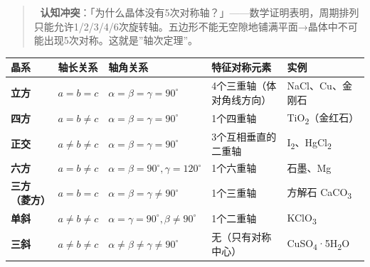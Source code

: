 \begin{quote}
🧠 \textbf{认知冲突}：「为什么晶体没有5次对称轴？」------数学证明表明，周期排列只能允许1/2/3/4/6次旋转轴。五边形不能无空隙地铺满平面→晶体中不可能出现5次对称。这就是''轴次定理''。
\end{quote}

{\def\LTcaptype{none} %
\begin{longtable}[]{@{}
  >{\raggedright\arraybackslash}p{}
  >{\raggedright\arraybackslash}p{}
  >{\raggedright\arraybackslash}p{}
  >{\raggedright\arraybackslash}p{}
  >{\raggedright\arraybackslash}p{}@{}}
\toprule\noalign{}
\begin{minipage}[b]{\linewidth}\raggedright
晶系
\end{minipage} & \begin{minipage}[b]{\linewidth}\raggedright
轴长关系
\end{minipage} & \begin{minipage}[b]{\linewidth}\raggedright
轴角关系
\end{minipage} & \begin{minipage}[b]{\linewidth}\raggedright
特征对称元素
\end{minipage} & \begin{minipage}[b]{\linewidth}\raggedright
实例
\end{minipage} \\
\midrule\noalign{}
\endhead
\bottomrule\noalign{}
\endlastfoot
\textbf{立方} & \(a = b = c\) & \(\alpha = \beta = \gamma = 90^\circ\) & 4个三重轴（体对角线方向） & NaCl、Cu、金刚石 \\
\textbf{四方} & \(a = b \neq c\) & \(\alpha = \beta = \gamma = 90^\circ\) & 1个四重轴 & TiO\textsubscript{2}（金红石） \\
\textbf{正交} & \(a \neq b \neq c\) & \(\alpha = \beta = \gamma = 90^\circ\) & 3个互相垂直的二重轴 & I\textsubscript{2}、HgCl\textsubscript{2} \\
\textbf{六方} & \(a = b \neq c\) & \(\alpha = \beta = 90^\circ, \gamma = 120^\circ\) & 1个六重轴 & 石墨、Mg \\
\textbf{三方（菱方）} & \(a = b = c\) & \(\alpha = \beta = \gamma \neq 90^\circ\) & 1个三重轴 & 方解石 CaCO\textsubscript{3} \\
\textbf{单斜} & \(a \neq b \neq c\) & \(\alpha = \gamma = 90^\circ, \beta \neq 90^\circ\) & 1个二重轴 & KClO\textsubscript{3} \\
\textbf{三斜} & \(a \neq b \neq c\) & \(\alpha \neq \beta \neq \gamma \neq 90^\circ\) & 无（只有对称中心） & CuSO\textsubscript{4}·5H\textsubscript{2}O \\
\end{longtable}
}

